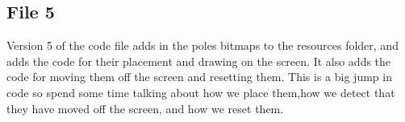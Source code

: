 \documentclass[12pt]{article}
\begin{document}
\newpage

\subsection*{File 5}
Version 5 of the code file adds in the poles bitmaps to the resources folder, and adds the code for their placement and drawing on the screen. It also
adds the code for moving them off the screen and resetting them. This is a big jump in code so spend some time talking about how we place them,how
we detect that they have moved off the screen, and how we reset them.
\end{document}
